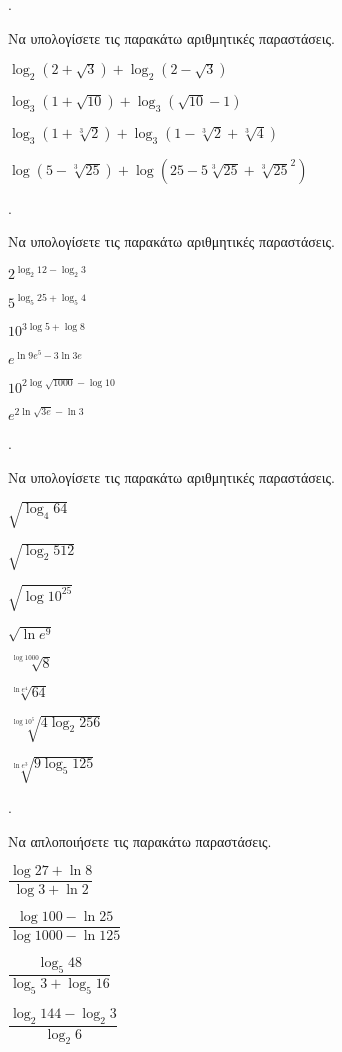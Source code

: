 \documentclass[11pt,a4paper,twocolumn]{article}
\newcounter{askhsh}
\newcommand{\askhsh}{\large\theaskhsh.\ \addtocounter{askhsh}{1}}
\begin{document}
\askhsh Να υπολογίσετε τις παρακάτω αριθμητικές παραστάσεις.
\begin{alist}
\item $ \log_{2}{\left(2+\sqrt{3}\right) }+\log_{2}{\left(2-\sqrt{3}\right)} $
\item $ \log_{3}{\left(1+\sqrt{10}\right) }+\log_{3}{\left(\sqrt{10}-1\right)} $
\item $ \log_{3}{\left(1+\sqrt[3]{2}\right) }+\log_{3}{\left(1-\sqrt[3]{2}+\sqrt[3]{4}\right)} $
\item $ \log{\left(5-\sqrt[3]{25}\right) }+\log{\left(25-5\sqrt[3]{25}+\sqrt[3]{25}^2\right)} $
\end{alist}
\askhsh Να υπολογίσετε τις παρακάτω αριθμητικές παραστάσεις.
\begin{multicols}{2}
\begin{alist}
\item $ 2^{\log_{2}{12}-\log_{2}{3}} $
\item $ 5^{\log_{5}{25}+\log_{5}{4}} $
\item $ 10^{3\log{5}+\log{8}} $
\item $ e^{\ln{9e^5}-3\ln{3e}} $
\item $ 10^{2\log{\sqrt{1000}}-\log{10}} $
\item $ e^{2\ln{\sqrt{3e}}-\ln{3}} $
\end{alist}
\end{multicols}
\askhsh Να υπολογίσετε τις παρακάτω αριθμητικές παραστάσεις.
\begin{multicols}{2}
\begin{alist}
\item $ \sqrt{\log_4{64}} $
\item $ \sqrt{\log_2{512}} $
\item $ \sqrt{\log{10^{25}}} $
\item $ \sqrt{\ln{e^9}} $
\item $ \sqrt[\log{1000}]{8} $
\item $ \sqrt[\ln{e^4}]{64} $
\item $ \sqrt[\log{10^5}]{4\log_2{256}} $
\item $ \sqrt[\ln{e^3}]{9\log_5{125}} $
\end{alist}
\end{multicols}
\askhsh Να απλοποιήσετε τις παρακάτω παραστάσεις.
\begin{multicols}{2}
\begin{alist}
\item $ \dfrac{\log{27}+\ln{8}}{\log{3}+\ln{2}} $
\item $ \dfrac{\log{100}-\ln{25}}{\log{1000}-\ln{125}} $
\item $ \dfrac{\log_5{48}}{\log_5{3}+\log_5{16}} $
\item $ \dfrac{\log_2{144}-\log_2{3}}{\log_2{6}} $
\end{alist}
\end{multicols}
\end{document}
